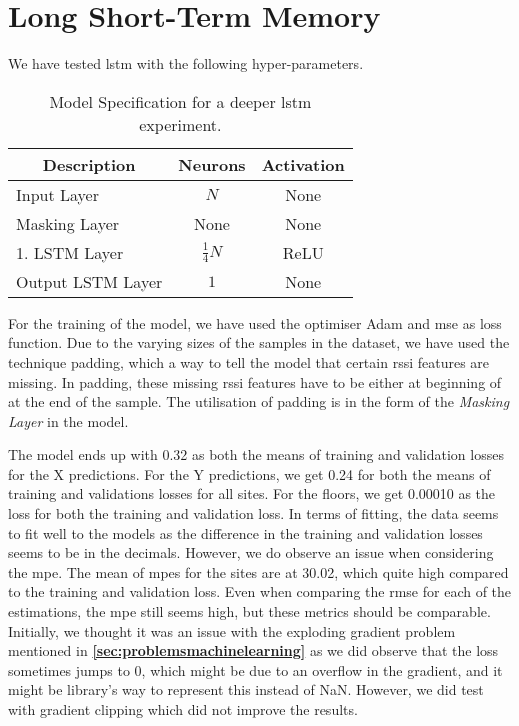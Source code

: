 \section{Long Short-Term Memory}
We have tested \gls{lstm} with the following hyper-parameters. 
\begin{table}[H]
    \centering
    \caption{Model Specification for a deeper \gls{lstm} experiment.}
    \begin{tabular}{m{}m{} m{}}
        \hline
        \multicolumn{1}{c}{\textbf{Description}} & \multicolumn{1}{c}{\textbf{Neurons}} & \multicolumn{1}{c}{\textbf{Activation}}\\
        \hline
        
        Input Layer         &   \multicolumn{1}{c}{$N$} & \multicolumn{1}{c}{None}        \\
        Masking Layer     & \multicolumn{1}{c}{None}    &  \multicolumn{1}{c}{None}    \\
        1. LSTM Layer     &   \multicolumn{1}{c}{$\frac{1}{4}N$}  & \multicolumn{1}{c}{ReLU}     \\
        Output LSTM Layer         &   \multicolumn{1}{c}{$1$} & \multicolumn{1}{c}{None}        \\
        \hline
    \end{tabular}
    \label{tab:lstm}
\end{table}
For the training of the model, we have used the optimiser Adam and \gls{mse} as loss function. Due to the varying sizes of the samples in the dataset, we have used the technique padding, which a way to tell the model that certain \gls{rssi} features are missing. In padding, these missing \gls{rssi} features have to be either at beginning of at the end of the sample. The utilisation of padding is in the form of the \textit{Masking Layer} in the model. 

The model ends up with 0.32 as both the means of training and validation losses for the X predictions. For the Y predictions, we get 0.24 for both the means of training and validations losses for all sites. For the floors, we get 0.00010 as the loss for both the training and validation loss. In terms of fitting, the data seems to fit well to the models as the difference in the training and validation losses seems to be in the decimals. However, we do observe an issue when considering the \gls{mpe}. The mean of \gls{mpe}s for the sites are at 30.02, which quite high compared to the training and validation loss. Even when comparing the \gls{rmse} for each of the estimations, the \gls{mpe} still seems high, but these metrics should be comparable. Initially, we thought it was an issue with the exploding gradient problem mentioned in \textbf{\autoref{sec:problemsmachinelearning}} as we did observe that the loss sometimes jumps to 0, which might be due to an overflow in the gradient, and it might be library's way to represent this instead of NaN. However, we did test with gradient clipping which did not improve the results. 

